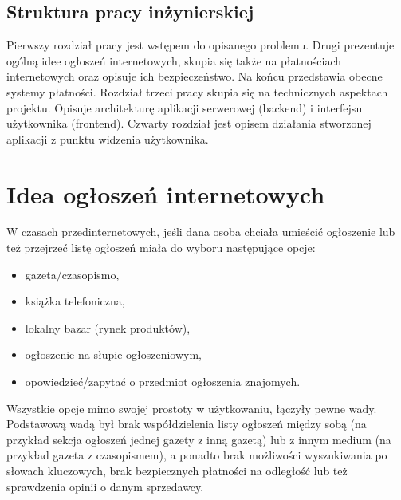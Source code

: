 \documentclass[12pt]{article}
\numberwithin{figure}{section}
\begin{document}
\begin{sloppypar}
\subsection{Struktura pracy inżynierskiej}
Pierwszy rozdział pracy jest wstępem do opisanego problemu. Drugi prezentuje ogólną idee ogłoszeń internetowych, skupia się także na płatnościach internetowych oraz opisuje ich bezpieczeństwo. Na końcu przedstawia obecne systemy płatności. Rozdział trzeci pracy skupia się na technicznych aspektach projektu. Opisuje architekturę aplikacji serwerowej (backend) i interfejsu użytkownika (frontend). Czwarty rozdział jest opisem działania stworzonej aplikacji z punktu widzenia użytkownika. 

\pagebreak
\section{Idea ogłoszeń internetowych}
W czasach przedinternetowych, jeśli dana osoba chciała umieścić ogłoszenie lub też przejrzeć listę ogłoszeń miała do wyboru następujące opcje:
\begin{itemize}
    \item gazeta/czasopismo,
    \item książka telefoniczna,
    \item lokalny bazar (rynek produktów),
    \item ogłoszenie na słupie ogłoszeniowym,
    \item opowiedzieć/zapytać o przedmiot ogłoszenia znajomych.
\end{itemize}

Wszystkie opcje mimo swojej prostoty w użytkowaniu, łączyły pewne wady. Podstawową wadą był brak współdzielenia listy ogłoszeń między sobą (na przykład sekcja ogłoszeń jednej gazety z inną gazetą) lub z innym medium (na przykład gazeta z czasopismem), a ponadto brak możliwości wyszukiwania po słowach kluczowych, brak bezpiecznych płatności na odległość lub też sprawdzenia opinii o danym sprzedawcy.


\end{sloppypar}
\end{document}
